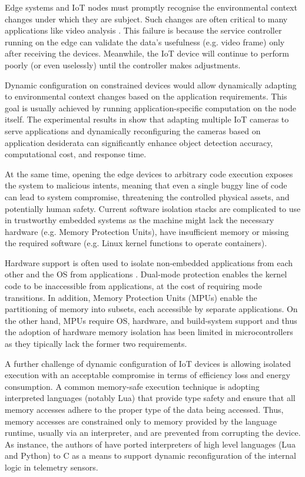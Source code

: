 Edge systems and IoT nodes must promptly recognise the environmental context changes under which they are subject. Such changes are often critical to many applications like video analysis \cite{camera-virtualisation}. This failure is because the service controller running on the edge can validate the data's usefulness (e.g. video frame) only after receiving the devices. Meanwhile, the IoT device will continue to perform poorly (or even uselessly) until the controller makes adjustments.

Dynamic configuration on constrained devices would allow dynamically adapting to environmental context changes based on the application requirements. This goal is usually achieved by running application-specific computation on the node itself. The experimental results in \cite{camera-virtualisation} show that adapting multiple IoT cameras to serve applications and dynamically reconfiguring the cameras based on application desiderata can significantly enhance object detection accuracy, computational cost, and response time.

At the same time, opening the edge devices to arbitrary code execution exposes the system to malicious intents, meaning that even a single buggy line of code can lead to system compromise, threatening the controlled physical assets, and potentially human safety. Current software isolation stacks are complicated to use in trustworthy embedded systems as the machine might lack the necessary hardware (e.g. Memory Protection Units), have insufficient memory or missing the required software (e.g. Linux kernel functions to operate containers). 

Hardware support is often used to isolate non-embedded applications from each other and the OS from applications \cite{ewasm}. Dual-mode protection enables the kernel code to be inaccessible from applications, at the cost of requiring mode transitions. In addition, Memory Protection Units (MPUs) enable the partitioning of memory into subsets, each accessible by separate applications. 
On the other hand, MPUs require OS, hardware, and build-system support and thus the adoption of hardware memory isolation has been limited in microcontrollers as they tipically lack the former two requirements.

A further challenge of dynamic configuration of IoT devices is allowing isolated execution with an acceptable compromise in terms of efficiency loss and energy consumption. A common memory-safe execution technique is adopting interpreted languages (notably Lua) that provide type safety and ensure that all memory accesses adhere to the proper type of the data being accessed. Thus, memory accesses are constrained only to memory provided by the language runtime, usually via an interpreter, and are prevented from corrupting the device. As instance, the authors of \cite{levee} have ported interpreters of high level languages (Lua and Python) to C as a means to support dynamic reconfiguration of the internal logic in telemetry sensors.

